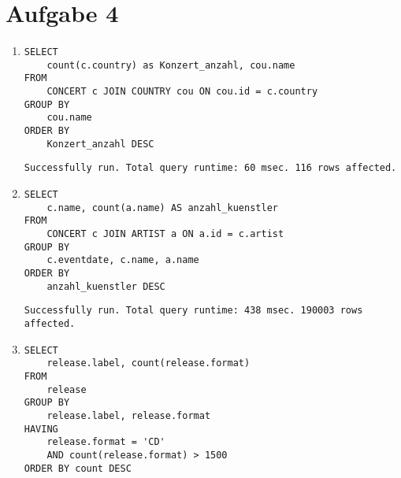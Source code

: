 \documentclass{article}
\begin{document}
\section*{Aufgabe 4}
    \begin{enumerate}
        \item
            \begin{verbatim}
SELECT
    count(c.country) as Konzert_anzahl, cou.name
FROM
    CONCERT c JOIN COUNTRY cou ON cou.id = c.country
GROUP BY
    cou.name
ORDER BY
    Konzert_anzahl DESC
            \end{verbatim}
        \texttt{Successfully run. Total query runtime: 60 msec. 116 rows affected.}
        \item
            \begin{verbatim}
SELECT
    c.name, count(a.name) AS anzahl_kuenstler
FROM
    CONCERT c JOIN ARTIST a ON a.id = c.artist
GROUP BY
    c.eventdate, c.name, a.name
ORDER BY
    anzahl_kuenstler DESC
            \end{verbatim}

            \texttt{Successfully run. Total query runtime: 438 msec.  190003 rows affected.}
        \item
            \begin{verbatim}
SELECT
    release.label, count(release.format)
FROM
    release
GROUP BY
    release.label, release.format
HAVING
    release.format = 'CD'
    AND count(release.format) > 1500
ORDER BY count DESC
            \end{verbatim}


\end{enumerate}
\end{document}
